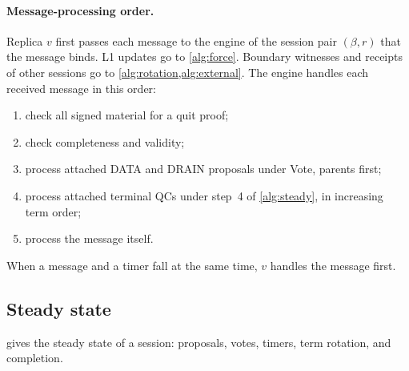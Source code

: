 \documentclass[11pt,a4paper]{article}
\newcommand{\RR}[1]{{\color{rrRed}#1}}
\begin{document}
\paragraph{Message-processing order.}\leavevmode
\RR{Replica $v$ first passes each message to the engine of the session
pair $(\beta,r)$ that the message binds. L1 updates go to \cref{alg:force}. Boundary witnesses and receipts of
other sessions go to \cref{alg:rotation,alg:external}.} The engine handles each received
message in this order:
\begin{enumerate}[label=(\arabic*)]
\item check all signed material for a quit proof;
\item check completeness and validity;
\item process attached DATA \RR{and DRAIN} proposals under Vote, parents
first;
\item process attached terminal QCs under step~4 of \cref{alg:steady},
in increasing term order;
\item process the message itself.
\end{enumerate}
When a message and a timer fall at the same time, $v$ handles the
message first.

\subsection{Steady state}
\label{sec:steady}
 gives the steady state of a session: proposals, votes,
timers, term rotation, and completion.
\end{document}
